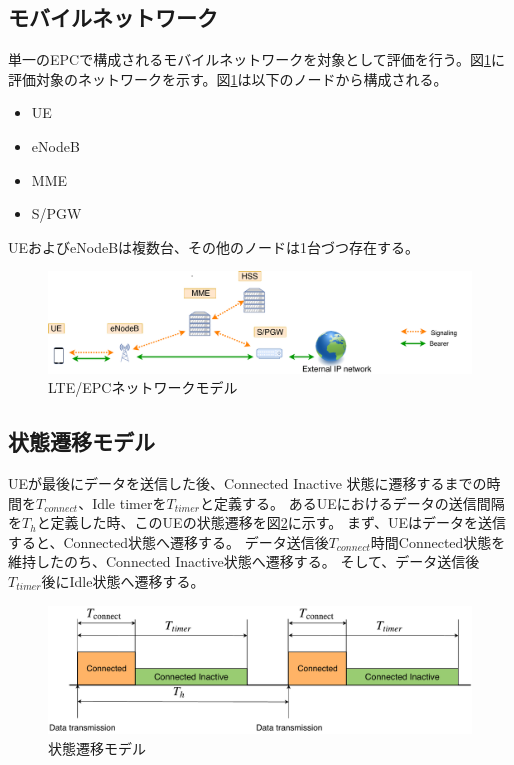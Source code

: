 \documentclass[a4j]{ujarticle}
\begin{document}
\subsection{モバイルネットワーク}
単一のEPCで構成されるモバイルネットワークを対象として評価を行う。図\ref{networkmodel}に評価対象のネットワークを示す。図\ref{networkmodel}は以下のノードから構成される。
\begin{itemize}
  \item UE
  \item eNodeB
  \item MME
  \item S/PGW
\end{itemize}
UEおよびeNodeBは複数台、その他のノードは1台づつ存在する。
\begin{figure}[htbp]
	\centering
	\includegraphics[width=0.7\hsize]{networkmodel.pdf}
  \caption{LTE/EPCネットワークモデル}
	\label{networkmodel}
\end{figure}

\subsection{状態遷移モデル}
UEが最後にデータを送信した後、Connected Inactive 状態に遷移するまでの時間を$T_{connect}$、Idle timerを$T_{timer}$と定義する。
あるUEにおけるデータの送信間隔を$T_h$と定義した時、このUEの状態遷移を図\ref{state_tran}に示す。
まず、UEはデータを送信すると、Connected状態へ遷移する。
データ送信後$T_{connect}$時間Connected状態を維持したのち、Connected Inactive状態へ遷移する。
そして、データ送信後$T_{timer}$後にIdle状態へ遷移する。
\begin{figure}[htbp]
	\centering
	\includegraphics[width=1.0\hsize]{state_tran.pdf}
  \caption{状態遷移モデル}
	\label{state_tran}
\end{figure}
\end{document}
